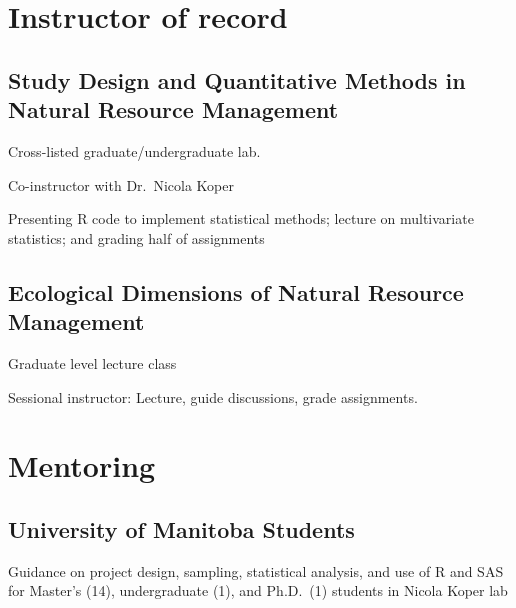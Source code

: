 \documentclass[
  letterpaper,
  DIV=11,
  numbers=noendperiod,
  oneside]{scrreprt}
\begin{document}
\section{Instructor of record}\label{instructor-of-record}

\subsection{Study Design and Quantitative Methods in Natural Resource
Management}\label{sec-nrm-quant}

Cross-listed graduate/undergraduate lab.


Co-instructor with Dr.~Nicola Koper

Presenting R code to implement statistical methods; lecture on
multivariate statistics; and grading half of assignments

\subsection{Ecological Dimensions of Natural Resource
Management}\label{ecological-dimensions-of-natural-resource-management}

Graduate level lecture class


Sessional instructor: Lecture, guide discussions, grade assignments.

\section{Mentoring}\label{mentoring-1}

\subsection{University of Manitoba
Students}\label{university-of-manitoba-students}

Guidance on project design, sampling, statistical analysis, and use of R
and SAS for Master's (14), undergraduate (1), and Ph.D.~(1) students in
Nicola Koper lab
\end{document}
